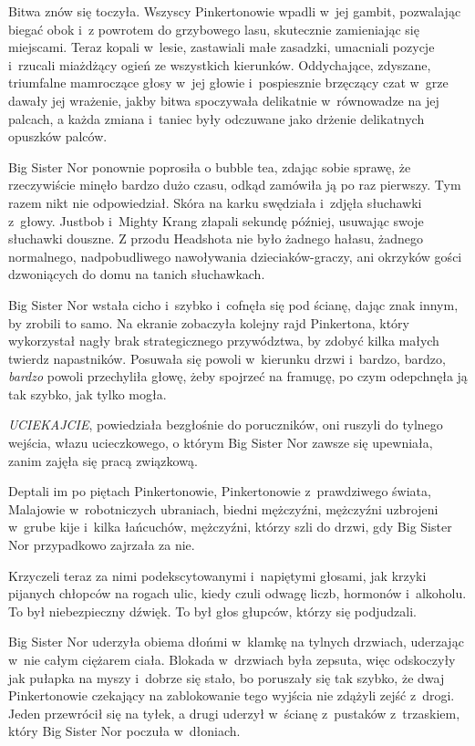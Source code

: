 \documentclass[oneside,polish,11pt,rmheadings]{mwbk}
\begin{document}
Bitwa znów się toczyła. Wszyscy Pinkertonowie wpadli w~jej gambit, pozwalając biegać obok i~z powrotem do grzybowego lasu, skutecznie zamieniając się miejscami. Teraz kopali w~lesie, zastawiali małe zasadzki, umacniali pozycje i~rzucali miażdżący ogień ze wszystkich kierunków. Oddychające, zdyszane, triumfalne mamroczące głosy w~jej głowie i~pospiesznie brzęczący czat w~grze dawały jej wrażenie, jakby bitwa spoczywała delikatnie w~równowadze na jej palcach, a każda zmiana i~taniec były odczuwane jako drżenie delikatnych opuszków palców. 


Big Sister Nor ponownie poprosiła o bubble tea, zdając sobie sprawę, że rzeczywiście minęło bardzo dużo czasu, odkąd zamówiła ją po raz pierwszy. Tym razem nikt nie odpowiedział. Skóra na karku swędziała i~zdjęła słuchawki z~głowy. Justbob i~Mighty Krang złapali sekundę później, usuwając swoje słuchawki douszne. Z przodu Headshota nie było żadnego hałasu, żadnego normalnego, nadpobudliwego nawoływania dzieciaków-graczy, ani okrzyków gości dzwoniących do domu na tanich słuchawkach. 


Big Sister Nor wstała cicho i~szybko i~cofnęła się pod ścianę, dając znak innym, by zrobili to samo. Na ekranie zobaczyła kolejny rajd Pinkertona, który wykorzystał nagły brak strategicznego przywództwa, by zdobyć kilka małych twierdz napastników. Posuwała się powoli w~kierunku drzwi i~bardzo, bardzo, \textit{bardzo }powoli przechyliła głowę, żeby spojrzeć na framugę, po czym odepchnęła ją tak szybko, jak tylko mogła. 


\textit{UCIEKAJCIE}, powiedziała bezgłośnie do poruczników, oni ruszyli do tylnego wejścia, włazu ucieczkowego, o którym Big Sister Nor zawsze się upewniała, zanim zajęła się pracą związkową. 


Deptali im po piętach Pinkertonowie, Pinkertonowie z~prawdziwego świata, Malajowie w~robotniczych ubraniach, biedni mężczyźni, mężczyźni uzbrojeni w~grube kije i~kilka łańcuchów, mężczyźni, którzy szli do drzwi, gdy Big Sister Nor przypadkowo zajrzała za nie. 


Krzyczeli teraz za nimi podekscytowanymi i~napiętymi głosami, jak krzyki pijanych chłopców na rogach ulic, kiedy czuli odwagę liczb, hormonów i~alkoholu. To był niebezpieczny dźwięk. To był głos głupców, którzy się podjudzali. 


Big Sister Nor uderzyła obiema dłońmi w~klamkę na tylnych drzwiach, uderzając w~nie całym ciężarem ciała. Blokada w~drzwiach była zepsuta, więc odskoczyły jak pułapka na myszy i~dobrze się stało, bo poruszały się tak szybko, że dwaj Pinkertonowie czekający na zablokowanie tego wyjścia nie zdążyli zejść z~drogi. Jeden przewrócił się na tyłek, a drugi uderzył w~ścianę z~pustaków z~trzaskiem, który Big Sister Nor poczuła w~dłoniach. 
\end{document}
